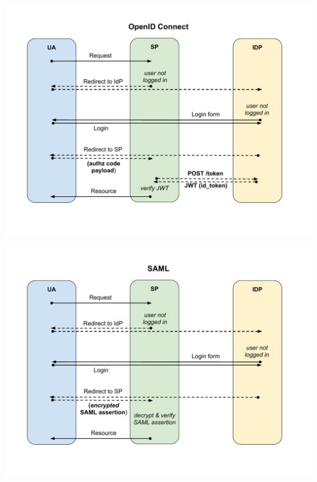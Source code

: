 \documentclass[ignorenonframetext,aspectratio=169]{beamer}
\begin{document}
\begin{frame}[plain]
\centering
\includegraphics[height=\paperheight]{fedsso-security-oidc.pdf}
\end{frame}

\begin{frame}[plain]
\centering
\includegraphics[height=\paperheight]{fedsso-security-saml.pdf}
\end{frame}
\end{document}
